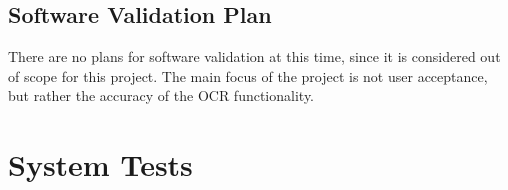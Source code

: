 \documentclass[12pt, titlepage]{article}
\begin{document}



\subsection{Software Validation Plan}

There are no plans for software validation at this time, since it is considered
out of scope for this project. The main focus of the project is not user
acceptance, but rather the accuracy of the OCR functionality.






\section{System Tests}
\end{document}
